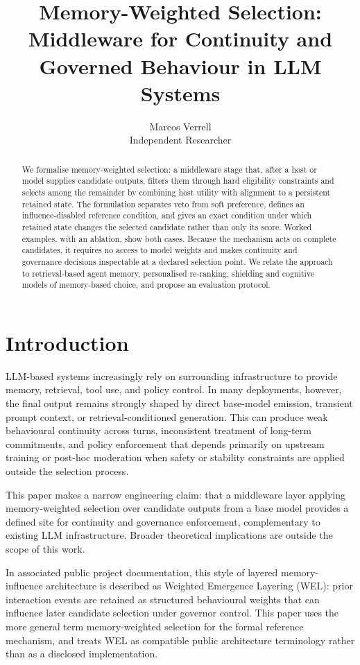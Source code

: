 \documentclass[11pt]{article}
\title{Memory-Weighted Selection: Middleware for Continuity and Governed Behaviour in LLM Systems}
\author{Marcos Verrell\\Independent Researcher}
\date{}
\begin{document}
\maketitle

\begin{abstract}
We formalise memory-weighted selection: a middleware stage that, after a host or model supplies candidate outputs, filters them through hard eligibility constraints and selects among the remainder by combining host utility with alignment to a persistent retained state. The formulation separates veto from soft preference, defines an influence-disabled reference condition, and gives an exact condition under which retained state changes the selected candidate rather than only its score. Worked examples, with an ablation, show both cases. Because the mechanism acts on complete candidates, it requires no access to model weights and makes continuity and governance decisions inspectable at a declared selection point. We relate the approach to retrieval-based agent memory, personalised re-ranking, shielding and cognitive models of memory-based choice, and propose an evaluation protocol.
\end{abstract}

\section{Introduction}

LLM-based systems increasingly rely on surrounding infrastructure to provide memory, retrieval, tool use, and policy control. In many deployments, however, the final output remains strongly shaped by direct base-model emission, transient prompt context, or retrieval-conditioned generation. This can produce weak behavioural continuity across turns, inconsistent treatment of long-term commitments, and policy enforcement that depends primarily on upstream training or post-hoc moderation when safety or stability constraints are applied outside the selection process.

This paper makes a narrow engineering claim: that a middleware layer applying memory-weighted selection over candidate outputs from a base model provides a defined site for continuity and governance enforcement, complementary to existing LLM infrastructure. Broader theoretical implications are outside the scope of this work.

In associated public project documentation, this style of layered memory-influence architecture is described as Weighted Emergence Layering (WEL): prior interaction events are retained as structured behavioural weights that can influence later candidate selection under governor control. This paper uses the more general term memory-weighted selection for the formal reference mechanism, and treats WEL as compatible public architecture terminology rather than as a disclosed implementation.
\end{document}
